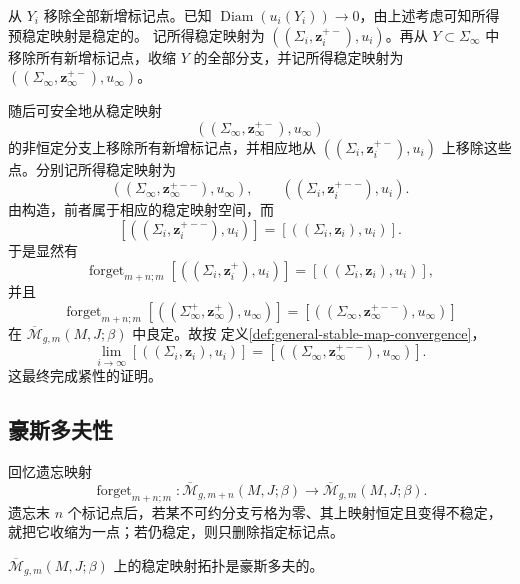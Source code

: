 从 $Y_i$ 移除全部新增标记点。已知
$\operatorname{Diam}(u_i(Y_i))\to0$，由上述考虑可知所得预稳定映射是稳定的。
记所得稳定映射为 $((\Sigma_i,\boldsymbol z_i^{+-}),u_i)$。再从
$Y\subset\Sigma_\infty$ 中移除所有新增标记点，收缩 $Y$ 的全部分支，并记所得稳定映射为
$((\Sigma_\infty,\boldsymbol z_\infty^{+-}),u_\infty)$。

随后可安全地从稳定映射
\[
 ((\Sigma_\infty,\boldsymbol z_\infty^{+-}),u_\infty)
\]
的非恒定分支上移除所有新增标记点，并相应地从
$((\Sigma_i,\boldsymbol z_i^{+-}),u_i)$ 上移除这些点。分别记所得稳定映射为
\[
 ((\Sigma_\infty,\boldsymbol z_\infty^{+--}),u_\infty),
 \qquad ((\Sigma_i,\boldsymbol z_i^{+--}),u_i).
\]
由构造，前者属于相应的稳定映射空间，而
\[
 [((\Sigma_i,\boldsymbol z_i^{+--}),u_i)]
 =[((\Sigma_i,\boldsymbol z_i),u_i)].
\]
于是显然有
\[
 \operatorname{forget}_{m+n;m}
 [((\Sigma_i,\boldsymbol z_i^+),u_i)]
 =[((\Sigma_i,\boldsymbol z_i),u_i)],
\]
并且
\[
 \operatorname{forget}_{m+n;m}
 [((\Sigma_\infty^+,\boldsymbol z_\infty^+),u_\infty)]
 =[((\Sigma_\infty,\boldsymbol z_\infty^{+--}),u_\infty)]
\]
在 $\overline{\mathcal M}_{g,m}(M,J;\beta)$ 中良定。故按
定义\ref{def:general-stable-map-convergence}，
\[
 \lim_{i\to\infty}[((\Sigma_i,\boldsymbol z_i),u_i)]
 =[((\Sigma_\infty,\boldsymbol z_\infty^{+--}),u_\infty)].
\]
这最终完成紧性的证明。

\subsection{豪斯多夫性}
\label{subsec:stable-map-hausdorff-property}

回忆遗忘映射
\[
 \operatorname{forget}_{m+n;m}:
 \overline{\mathcal M}_{g,m+n}(M,J;\beta)
 \longrightarrow\overline{\mathcal M}_{g,m}(M,J;\beta).
\]
遗忘末 $n$ 个标记点后，若某不可约分支亏格为零、其上映射恒定且变得不稳定，就把它收缩为一点；若仍稳定，则只删除指定标记点。

\begin{theorem}\label{thm:stable-map-topology-hausdorff}
$\overline{\mathcal M}_{g,m}(M,J;\beta)$ 上的稳定映射拓扑是豪斯多夫的。
\end{theorem}

